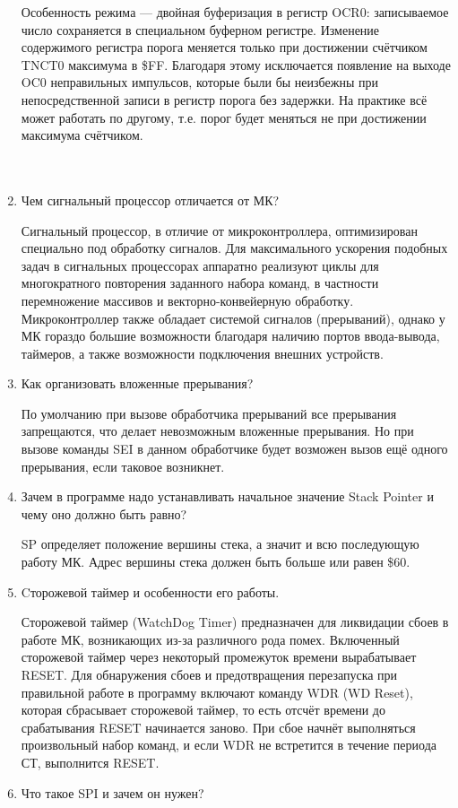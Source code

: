 \documentclass{lab}
\begin{document}
\begin{enumerate}
	Особенность режима — двойная буферизация в регистр OCR0: записываемое число
	сохраняется в специальном буферном регистре. Изменение содержимого регистра порога
	меняется только при достижении счётчиком TNCT0 максимума в \$FF. Благодаря этому
	исключается появление на выходе OC0 неправильных импульсов, которые были бы
	неизбежны при непосредственной записи в регистр порога без задержки. На практике всё может работать по другому, т.е. порог будет меняться не при достижении максимума счётчиком.\\\\\\
	
	\item Чем сигнальный процессор отличается от МК?
	
	Сигнальный процессор, в отличие от микроконтроллера, оптимизирован специально под обработку сигналов. Для максимального ускорения подобных задач в сигнальных процессорах аппаратно реализуют циклы для многократного повторения заданного набора команд, в частности перемножение массивов и векторно-конвейерную обработку. Микроконтроллер также обладает системой сигналов (прерываний), однако у МК гораздо большие возможности благодаря наличию портов ввода-вывода, таймеров, а также возможности подключения внешних устройств.
	
	\item Как организовать вложенные прерывания?
	
	По умолчанию при вызове обработчика прерываний все прерывания запрещаются, что
	делает невозможным вложенные прерывания. Но при вызове команды SEI в данном
	обработчике будет возможен вызов ещё одного прерывания, если таковое возникнет.
	\item Зачем в программе надо устанавливать начальное значение Stack Pointer и чему оно должно быть равно?
	
	SP определяет положение вершины стека, а значит и всю последующую работу МК. Адрес вершины стека должен быть больше или равен
	\$60.
	
	\item Cторожевой таймер и особенности его работы.
	
	Сторожевой таймер (WatchDog Timer) предназначен для ликвидации сбоев в работе
	МК, возникающих из-за различного рода помех. Включенный сторожевой таймер через некоторый промежуток времени вырабатывает RESET. Для обнаружения сбоев и
	предотвращения перезапуска при правильной работе в программу включают команду
	WDR (WD Reset), которая сбрасывает сторожевой таймер, то есть отсчёт времени до
	срабатывания RESET начинается заново. При сбое начнёт выполняться произвольный
	набор команд, и если WDR не встретится в течение периода СТ, выполнится RESET.
	\item Что такое SPI и зачем он нужен?
	

\end{enumerate}
\end{document}
